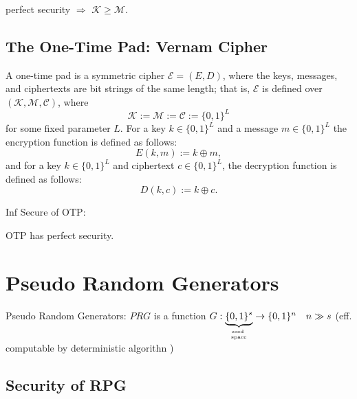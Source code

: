 \begin{theorem}
    perfect security $\Rightarrow$ $\mathcal{K} \ge \mathcal{M}$.
\end{theorem}


\subsection{The One-Time Pad: Vernam Cipher}

\begin{definition} 

    A one-time pad is a symmetric cipher $\mathcal{E}=(E, D)$, where the keys, messages, and ciphertexts are bit strings of the same length; that is, $\mathcal{E}$ is defined over $(\mathcal{K}, \mathcal{M}, \mathcal{C})$, where
    $$
    \mathcal{K}:=\mathcal{M}:=\mathcal{C}:=\{0,1\}^{L}
    $$
    for some fixed parameter $L$. For a key $k \in\{0,1\}^{L}$ and a message $m \in\{0,1\}^{L}$ the encryption function is defined as follows:
    $$
    E(k, m):=k \oplus m,
    $$
    and for a key $k \in\{0,1\}^{L}$ and ciphertext $c \in\{0,1\}^{L}$, the decryption function is defined as follows:
    $$
    D(k, c):=k \oplus c .
    $$
    
\end{definition}


\begin{theorem}  Inf Secure of OTP:

    OTP has perfect security.
    
\end{theorem}


\section{Pseudo Random Generators}


\begin{definition}  Pseudo Random Generators:
    $P R G$ is a function $G: \underbrace{\{0,1\}^{s}}_{\text {seed } \atop \text { space }} \rightarrow\{0,1\}^{n} \quad n \gg s$
    (eff. computable by deterministic algorithn )
\end{definition}

\subsection{Security of RPG}

